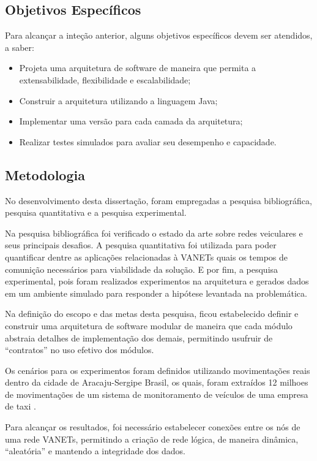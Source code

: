 \documentclass[
	12pt,				%
	oneside,			%
	a4paper,			%
	english,			%
	brazil				%
	]{abntex2ppgsi}
\begin{document}
\subsection{Objetivos Específicos}
Para alcançar a inteção anterior, alguns objetivos específicos devem ser atendidos,  a saber: 
\begin{itemize}
	\item{Projeta uma arquitetura de software de maneira que permita a extensabilidade, flexibilidade e escalabilidade;}	
	\item{Construir a arquitetura utilizando a linguagem Java;}	
	\item{Implementar uma versão para cada camada da arquitetura;}	
	\item{Realizar testes simulados para avaliar seu desempenho e capacidade.}	
\end{itemize} 

\subsection{Metodologia}

No desenvolvimento desta dissertação, foram empregadas a pesquisa bibliográfica, pesquisa quantitativa e a pesquisa experimental.

Na pesquisa bibliográfica foi verificado o estado da arte sobre redes veiculares e seus principais desafios. A pesquisa quantitativa foi utilizada para poder quantificar dentre as aplicações relacionadas à VANETs quais os tempos de comunição necessários para viabilidade da solução. E por fim, a pesquisa experimental, pois foram realizados experimentos na arquitetura e gerados dados em um ambiente simulado para responder a hipótese levantada na problemática.

Na definição do escopo e das metas desta pesquisa, ficou estabelecido definir e construir uma arquitetura de software modular de maneira que cada módulo abstraia detalhes de implementação dos demais, permitindo usufruir de ``contratos'' no uso efetivo dos módulos.

Os cenários para os experimentos foram definidos utilizando movimentações reais dentro da cidade de Aracaju-Sergipe Brasil, os quais, foram extraídos 12 milhoes de movimentações de um sistema de monitoramento de veículos de uma empresa de taxi .

Para alcançar os resultados, foi necessário estabelecer conexões entre os nós de uma rede VANETs, permitindo a criação de rede lógica, de maneira dinâmica, ``aleatória'' e mantendo a integridade dos dados.
\end{document}
